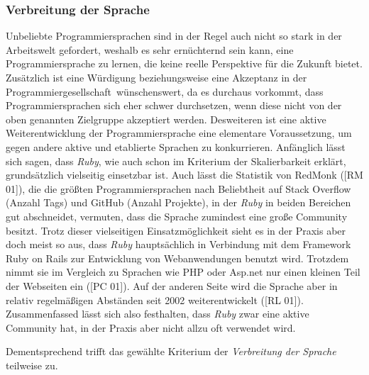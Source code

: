 \documentclass[12pt,DIV=14, version=first, BCOR=10mm,a4paper,twoside,parskip=half-,headsepline,headinclude]{scrartcl}
\begin{document}
\subsubsection{Verbreitung der Sprache}
\begin{flushleft}
Unbeliebte Programmiersprachen sind in der Regel auch nicht so stark in der Arbeitswelt gefordert, weshalb es sehr ernüchternd sein kann, eine Programmiersprache zu lernen, die keine reelle Perspektive für die Zukunft bietet. Zusätzlich ist eine Würdigung beziehungsweise eine Akzeptanz in der \glqq Programmiergesellschaft\grqq \, wünschenswert, da es durchaus vorkommt, dass Programmiersprachen sich eher schwer durchsetzen, wenn diese nicht von der oben genannten Zielgruppe akzeptiert werden. Desweiteren ist eine aktive Weiterentwicklung der Programmiersprache eine elementare Voraussetzung, um gegen andere aktive und etablierte Sprachen zu konkurrieren.
Anfänglich lässt sich sagen, dass \textit{\glqq Ruby\grqq}, wie auch schon im Kriterium der Skalierbarkeit erklärt, grundsätzlich vielseitig einsetzbar ist. Auch lässt die Statistik von {\glqq RedMonk\grqq} ([RM 01]), die die größten Programmiersprachen nach Beliebtheit auf {\glqq Stack Overflow\grqq} (Anzahl Tags) und {\glqq GitHub\grqq} (Anzahl Projekte), in der \textit{\glqq Ruby\grqq} in beiden Bereichen gut abschneidet, vermuten, dass die Sprache zumindest eine große Community besitzt. Trotz dieser vielseitigen Einsatzmöglichkeit sieht es in der Praxis aber doch meist so aus, dass \textit{\glqq Ruby\grqq} hauptsächlich in Verbindung mit dem Framework {\glqq Ruby on Rails\grqq} zur Entwicklung von Webanwendungen benutzt wird. Trotzdem nimmt sie im Vergleich zu Sprachen wie {\glqq PHP\grqq} oder {\glqq Asp.net\grqq} nur einen kleinen Teil der Webseiten ein ([PC 01]). Auf der anderen Seite wird die Sprache aber in relativ regelmäßigen Abständen seit 2002 weiterentwickelt ([RL 01]). Zusammenfassed lässt sich also festhalten, dass \textit{\glqq Ruby\grqq} zwar eine aktive Community hat, in der Praxis aber nicht allzu oft verwendet wird.

Dementsprechend trifft das gewählte Kriterium der \textit{Verbreitung der Sprache} teilweise zu.
\end{flushleft}
\end{document}

